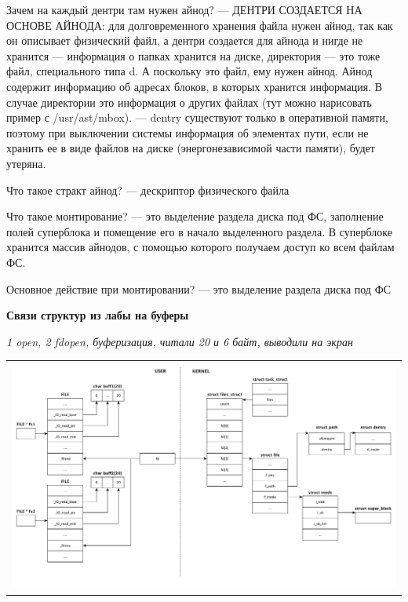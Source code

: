 Зачем на каждый дентри там нужен айнод? --- ДЕНТРИ СОЗДАЕТСЯ НА ОСНОВЕ АЙНОДА: для долговременного хранения файла нужен айнод, так как он описывает физический файл, а дентри создается для айнода и нигде не хранится --- информация о папках хранится на диске, директория — это тоже файл, специального типа d. А поскольку это файл, ему нужен айнод. Айнод содержит информацию об адресах блоков, в которых хранится информация. В случае директории это информация о других файлах (тут можно нарисовать пример с /usr/ast/mbox). --- dentry существуют только в оперативной памяти, поэтому при выключении системы информация об элементах пути, если не хранить ее в виде файлов на диске (энергонезависимой части памяти), будет утеряна.

Что такое стракт айнод? --- дескриптор физического файла

Что такое монтирование? --- это выделение раздела диска под ФС, заполнение полей суперблока и помещение его в начало выделенного раздела. В суперблоке хранится массив айнодов, с помощью которого получаем доступ ко всем файлам ФС.

Основное действие при монтировании? --- это выделение раздела диска под ФС

\textbf{Связи структур из лабы на буферы}

\textit{1 open, 2 fdopen, буферизация, читали 20 и 6 байт, выводили на экран}
\begin{table}[H]
  \centering
  \begin{tabular}{p{1\linewidth}}
    \centering
    \includegraphics[width=0.8\linewidth]{./images/scheme1.pdf}
  \end{tabular}
\end{table}

